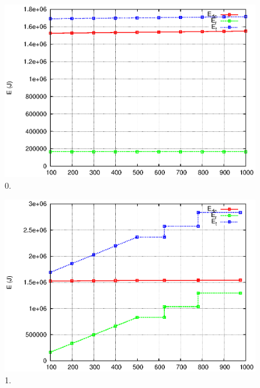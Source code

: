\documentclass[JIP]{ipsj}
\begin{document}
\begin{figure}[thb]
\begin{center}
\includegraphics[scale=0.6]{graphs/cdn.eps}
\end{center}
\caption{0.}
\label{fig:4-0}
\vspace{-2mm}
\end{figure} 



\begin{figure}[thb]
\begin{center}
\includegraphics[scale=0.6]{graphs/cdnp2p-1.eps}
\end{center}
\caption{1.}
\label{fig:4-1}
\vspace{-2mm}
\end{figure} 
\end{document}
